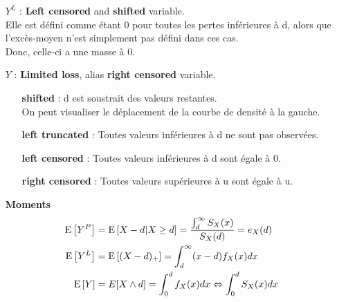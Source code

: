 \documentclass[french, landscape]{article}
\begin{document}
\begin{multicols*}{3}
\begin{itemize}
\item[$Y^L$ : ] 
	\textbf{Left censored} and \textbf{shifted} variable. \\ 
	Elle est défini comme étant 0 pour toutes les pertes inférieures à d, alors que l'excès-moyen n'est simplement pas défini dans ces cas. \\
	Donc, celle-ci a une masse à 0.


\item[$Y$ : ] 
	\textbf{Limited loss}, alias \textbf{right censored} variable. \\ 
	


	\begin{itemize}
		\item[\textbf{shifted} :] d est soustrait des valeurs restantes. \\
		On peut visualiser le déplacement de la courbe de densité à la gauche.
		\item[\textbf{left truncated} :] Toutes valeurs inférieures à d ne sont pas observées.			\item[\textbf{left censored} :] Toutes valeurs inférieures à d sont égale à 0.
		\item[\textbf{right censored} :] Toutes valeurs supérieures à u sont égale à u.
	\end{itemize}	
\end{itemize}


\begin{itemize}
\item[] \textbf{Moments}
\begin{align*}
	\mathrm{E} \left[ Y^P \right] &= \mathrm{E} \left[ X-d | X \geq d \right] = \frac{\int_{d}^{\infty} S_X(x)}{S_X(d)} = e_X(d) \\
	\mathrm{E} \left[ Y^L \right] &= \mathrm{E} \left[ (X - d)_+ \right] = \int_{d}^{\infty} (x - d) f_X(x) dx \\
	\mathrm{E} \left[ Y \right] &= E[X \wedge d] = \int_0^d f_X(x) dx \Leftrightarrow \int_0^d S_X(x) dx
\end{align*}

\end{itemize}


\end{multicols*}
\end{document}
